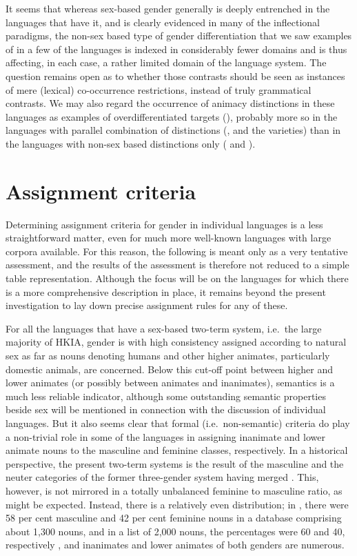 \documentclass[output=collectionpaper]{langsci/langscibook}
\begin{document}
It seems that whereas sex-based gender generally is deeply entrenched in the languages that have it, and is clearly evidenced in many of the inflectional paradigms, the non-sex based type of gender differentiation that we saw examples of in a few of the languages is indexed in considerably fewer domains and is thus affecting, in each case, a rather limited domain of the language system. The question remains open as to whether those contrasts should be seen as instances of mere (lexical) co-occurrence restrictions, instead of truly grammatical contrasts. We may also regard the occurrence of animacy distinctions in these languages as examples of overdifferentiated targets (\citealt[168--169]{Corbett1991}), probably more so in the languages with parallel combination of distinctions (,  and the  varieties) than in the languages with non-sex based distinctions only ( and ).

\section{Assignment criteria}
\label{sec:Lilje:6}

Determining assignment criteria for gender in individual languages is a less straightforward matter, even for much more well-known languages with large corpora available. For this reason, the following is meant only as a very tentative assessment, and the results of the assessment is therefore not reduced to a simple table representation. Although the focus will be on the languages for which there is a more comprehensive description in place, it remains beyond the present investigation to lay down precise assignment rules for any of these.

For all the languages that have a sex-based two-term system, i.e.\ the large majority of HKIA, gender is with high consistency assigned according to natural sex as far as nouns denoting humans and other higher animates, particularly domestic animals, are concerned. Below this cut-off point between higher and lower animates (or possibly between animates and inanimates), semantics is a much less reliable indicator, although some outstanding semantic properties beside sex will be mentioned in connection with the discussion of individual languages. But it also seems clear that formal (i.e.\ non-semantic) criteria do play a non-trivial role in some of the languages in assigning inanimate and lower animate nouns to the masculine and feminine classes, respectively. In a historical perspective, the present two-term systems is the result of the masculine and the neuter categories of the former three-gender system having merged \citep[221]{Masica1991}. This, however, is not mirrored in a totally unbalanced feminine to masculine ratio, as might be expected. Instead, there is a relatively even distribution; in , there were 58 per cent masculine and 42 per cent feminine nouns in a database comprising about 1,300 nouns, and in a  list of 2,000 nouns, the percentages were 60 and 40, respectively \citep[82]{Baart1999}, and inanimates and lower animates of both genders are numerous.
\end{document}
